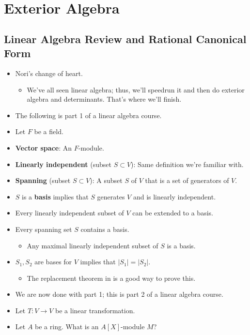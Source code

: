 \documentclass[../notes.tex]{subfiles}
\begin{document}
\chapter{Exterior Algebra}
\section{Linear Algebra Review and Rational Canonical Form}
\begin{itemize}
    \item {}Nori's change of heart.
    \begin{itemize}
        \item We've all seen linear algebra; thus, we'll speedrun it and then do exterior algebra and determinants. That's where we'll finish.
    \end{itemize}
    \item The following is part 1 of a linear algebra course.
    \item Let $F$ be a field.
    \item \textbf{Vector space}: An $F$-module.
    \item \textbf{Linearly independent} (subset $S\subset V$): Same definition we're familiar with.
    \item \textbf{Spanning} (subset $S\subset V$): A subset $S$ of $V$ that is a set of generators of $V$.
    \item $S$ is a \textbf{basis} implies that $S$ generates $V$ and is linearly independent.
    \item Every linearly independent subset of $V$ can be extended to a basis.
    \item Every spanning set $S$ contains a basis.
    \begin{itemize}
        \item Any maximal linearly independent subset of $S$ is a basis.
    \end{itemize}
    \item $S_1,S_2$ are bases for $V$ implies that $|S_1|=|S_2|$.
    \begin{itemize}
        \item The replacement theorem in \textcite{bib:DummitFoote} is a good way to prove this.
    \end{itemize}
    \item We are now done with part 1; this is part 2 of a linear algebra course.
    \item Let $T:V\to V$ be a linear transformation.
    \item Let $A$ be a ring. What is an $A[X]$-module $M$?

\end{itemize}
\end{document}
